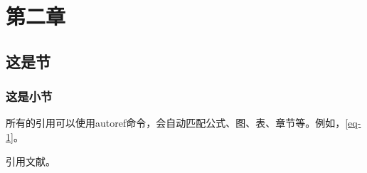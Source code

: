 \chapter{第二章}

\section{这是节}

\subsection{这是小节}


所有的引用可以使用autoref命令，会自动匹配公式、图、表、章节等。例如，\autoref{eq-1}。

引用文献\cite{trozzi2021umap}。


\let\cleardoublepage\clearpage



